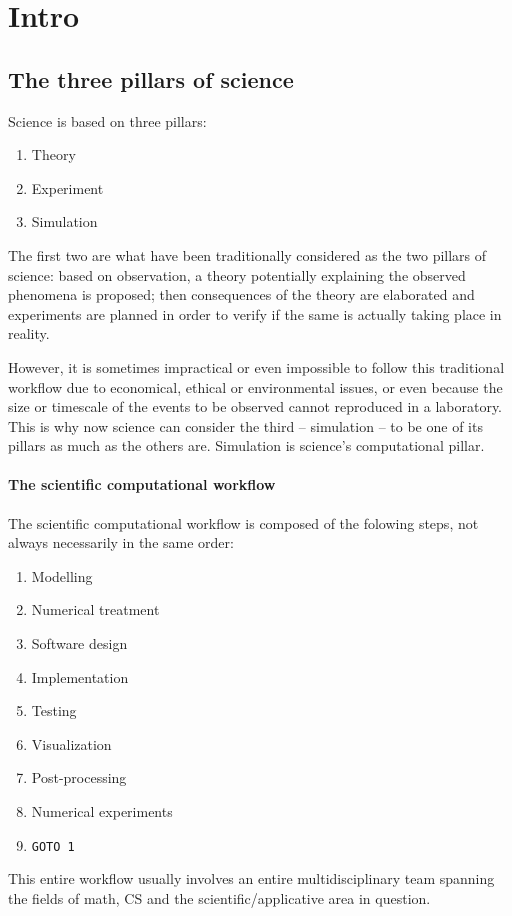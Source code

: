 \section{Intro}
\subsection{The three pillars of science}
Science is based on three pillars:
\begin{enumerate}
	\item Theory
	\item Experiment
	\item Simulation
\end{enumerate}
The first two are what have been traditionally considered as the two pillars of science: based on observation, a theory potentially explaining the observed phenomena is proposed; then consequences of the theory are elaborated and experiments are planned in order to verify if the same is actually taking place in reality.

However, it is sometimes impractical or even impossible to follow this traditional workflow due to economical, ethical or environmental issues, or even because the size or timescale of the events to be observed cannot reproduced in a laboratory. This is why now science can consider the third -- simulation -- to be one of its pillars as much as the others are. Simulation is science's computational pillar.

\paragraph{The scientific computational workflow}
The scientific computational workflow is composed of the folowing steps, not always necessarily in the same order:
\begin{enumerate}[(1)]
	\item Modelling
	\item Numerical treatment
	\item Software design
	\item Implementation
	\item Testing
	\item Visualization
	\item Post-processing
	\item Numerical experiments
	\item \texttt{GOTO 1}
\end{enumerate}
This entire workflow usually involves an entire multidisciplinary team spanning the fields of math, CS and the scientific/applicative area in question.

